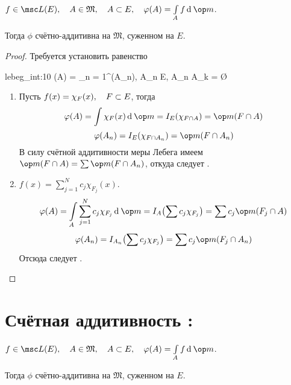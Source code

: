 \begin{theorem}
	$ f \in \msc L(E), \quad A \in \mathfrak M, \quad A \sub E, \quad \phi(A) = \int\limits_A f \di \op m $.

	Тогда $ \phi $ счётно-аддитивна на $ \mathfrak M $, суженном на $ E $.
\end{theorem}

\begin{proof}
	Требуется установить равенство
	\begin{equ}{lebeg_int:10}
		\phi(A) = \sum_{n = 1}^\infty \phi(A_n), \quad {} A_n \sub E, \quad A_n \cap A_k = \O
	\end{equ}

	\begin{enumerate}
		\item Пусть $ f(x) = \chi_F(x), \quad F \subset E $, тогда
			$$ \phi(A) = \int\limits \chi_F(x) \di \op m = I_E(\chi_{F \cap A}) = \op m (F \cap A) $$
			$$ \phi(A_n) = I_E(\chi_{F \cap A_n}) = \op m (F \cap A_n) $$
			В силу счётной аддитивности меры Лебега имеем $ \op m(F \cap A) = \sum \op m(F \cap A_n) $, откуда следует .

		\item \label{en:lebeg_int:2} $ f(x) = \sum_{j = 1}^N c_j \chi_{F_j}(x) $.
			$$ \phi(A) = \int\limits_A \sum_{j = 1}^N c_j \chi_{F_j} \di \op m = I_A \bigl( \sum c_j \chi_{F_j} \bigr) = \sum c_j \op m(F_j \cap A) $$
			$$ \phi(A_n) = I_{A_n} \bigl( \sum c_j \chi_{F_j} \bigr) = \sum c_j \op m (F_j \cap A_n) $$
			Отсюда следует .
	\end{enumerate}
\end{proof}

\section{Счётная аддитивность : }

\begin{theorem}
	$ f \in \msc L(E), \quad A \in \mathfrak M, \quad A \sub E, \quad \phi(A) = \int\limits_A f \di \op m $.

	Тогда $ \phi $ счётно-аддитивна на $ \mathfrak M $, суженном на $ E $.
\end{theorem}

